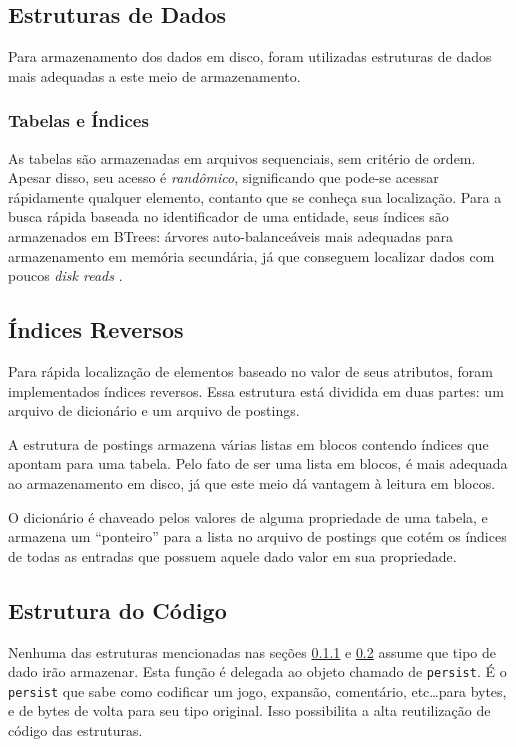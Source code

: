 \documentclass[hidelinks,12pt,article,twocolumn,brazil]{abntex2}
\begin{document}
\subsection{Estruturas de Dados}

Para armazenamento dos dados em disco, foram utilizadas estruturas de dados mais adequadas a este meio de armazenamento.

\subsubsection{Tabelas e Índices}
\label{estrut_tabelas}

As tabelas são armazenadas em arquivos sequenciais, sem critério de ordem. Apesar disso, seu acesso é \textit{randômico}, significando que pode-se acessar rápidamente qualquer elemento, contanto que se conheça sua localização. Para a busca rápida baseada no identificador de uma entidade, seus índices são armazenados em BTrees: árvores auto-balanceáveis mais adequadas para armazenamento em memória secundária, já que conseguem localizar dados com poucos \textit{disk reads} \cite{knuth1973art}.

\subsection{Índices Reversos}
\label{estrut_indices}

Para rápida localização de elementos baseado no valor de seus atributos, foram implementados índices reversos. Essa estrutura está dividida em duas partes: um arquivo de dicionário e um arquivo de postings.

A estrutura de postings armazena várias listas em blocos contendo índices que apontam para uma tabela. Pelo fato de ser uma lista em blocos, é mais adequada ao armazenamento em disco, já que este meio dá vantagem à leitura em blocos.

O dicionário é chaveado pelos valores de alguma propriedade de uma tabela, e armazena um ``ponteiro'' para a lista no arquivo de postings que cotém os índices de todas as entradas que possuem aquele dado valor em sua propriedade.

\subsection{Estrutura do Código}

Nenhuma das estruturas mencionadas nas seções \ref{estrut_tabelas} e \ref{estrut_indices} assume que tipo de dado irão armazenar. Esta função é delegada ao objeto chamado de \texttt{persist}. É o \texttt{persist} que sabe como codificar um jogo, expansão, comentário, etc\ldots para bytes, e de bytes de volta para seu tipo original. Isso possibilita a alta reutilização de código das estruturas.
\end{document}
